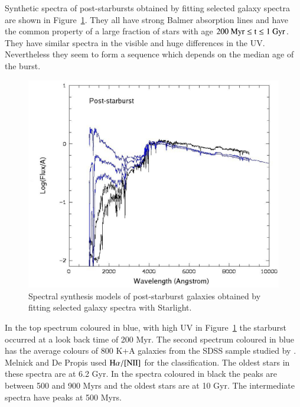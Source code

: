 \documentclass[referee]{aa}
\begin{document}
Synthetic spectra of post-starbursts obtained by fitting selected galaxy spectra
are shown in Figure~\ref{post-starburst}. They all have strong Balmer absorption
lines and have the common property of a large fraction of stars with
age $\rm 200~ Myr \leq t \leq 1~Gyr$. They have similar spectra in the
visible and huge differences in the UV. Nevertheless they seem to form a sequence
which depends on the median age of the burst.


\begin{figure}
   \vspace*{-0.0cm}
   \includegraphics[width=14cm]{figures/post-starburst.eps}
       \vspace*{-0.0cm}
    \caption{Spectral synthesis models of post-starburst galaxies obtained by fitting selected galaxy spectra with Starlight.}
    \label{post-starburst}
\end{figure}

 In the top spectrum coloured in blue, with high UV  in Figure~\ref{post-starburst} the starburst occurred
at a look back time of 200 Myr. The second spectrum coloured in blue has the average colours of 800 K+A galaxies
from the SDSS sample studied by \citep{Melnick:2013}. Melnick
and De Propis used $\rm H\alpha /[NII] $ for the classification. The oldest stars in these spectra are at 6.2 Gyr. In the spectra coloured in 
black the peaks are between 500 and 900 Myrs and
the oldest stars are at 10 Gyr. The
intermediate spectra have peaks at 500 Myrs.
\end{document}
